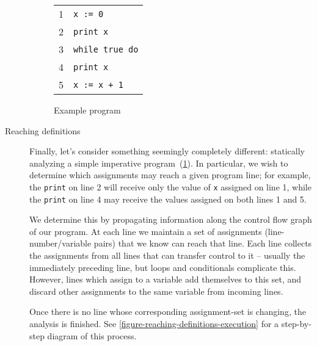 \begin{description}


\begin{figure}[pth]
  \centering
  \ttfamily
  \begin{tabular}{cl}
    1 & \tt x := 0\\
    2 & \tt print x\\
    3 & \tt while true do\\
    4 & \tt\quad print x\\
    5 & \tt\quad x := x + 1
  \end{tabular}
  \caption{Example program}
  \label{figure-reaching-definitions}
\end{figure}

\item[Reaching definitions]
%
Finally, let's consider something seemingly completely different: statically
analyzing a simple imperative program~(\cref{figure-reaching-definitions}).
%
%
In particular, we wish to determine which assignments may reach a given program
line; for example, the \texttt{print} on line 2 will receive only the value of
\texttt{x} assigned on line 1, while the \texttt{print} on line 4 may receive
the values assigned on both lines 1 and 5.

We determine this by propagating information along the control flow graph of our
program.
%
At each line we maintain a set of assignments (line-number/variable pairs) that
we know can reach that line.
%
Each line collects the assignments from all lines that can transfer control to
it -- usually the immediately preceding line, but loops and conditionals
complicate this.
%
However, lines which assign to a variable add themselves to this set, and discard other assignments to the same variable from incoming lines.

Once there is no line whose corresponding assignment-set is changing, the analysis is finished.
%
See \cref{figure-reaching-definitions-execution} for a step-by-step diagram of this process. 



\end{description}

